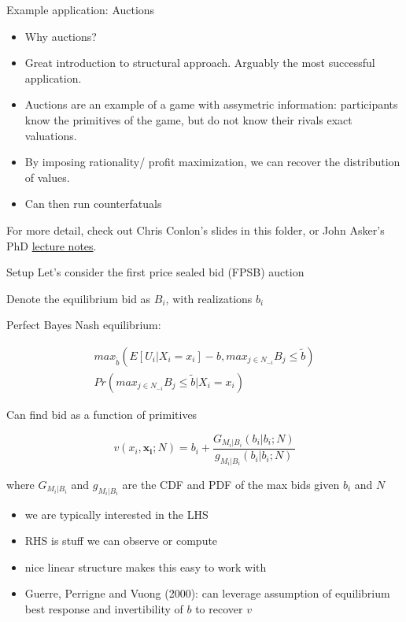 \begin{frame}{Example application: Auctions}
  \begin{itemize}
    \item Why auctions? 
    \item Great introduction to structural approach. Arguably the most successful application. 
    \item Auctions are an example of a game with assymetric information: participants know the primitives of the game, but do not know their rivals exact valuations. 
    \item By imposing rationality/ profit maximization, we can recover the distribution of values. 
    \item Can then run counterfatuals
  \end{itemize}

For more detail, check out Chris Conlon's slides in this folder, or John Asker's PhD \href{http://www.johnasker.com}{lecture notes}.

\end{frame}

\begin{frame}{Setup}
Let's consider the first price sealed bid (FPSB) auction

Denote the equilibrium bid as $B_i$, with realizations $b_i$

\vspace{10pt}

Perfect Bayes Nash equilibrium:
\vspace{-10pt}

\begin{multline*} 
  max_{\tilde b}  \left( E \left[ U_i | X_i = x_i \right] - b , max_{j \in N_{-i}} B_j \leq \tilde b \right) \\ Pr \left( max_{j \in N_{-i}} B_j \leq \tilde b | X_i = x_i \right) 
\end{multline*}
\end{frame}  

\begin{frame}{Can find bid as a function of primitives}

  $$ v(x_i,\mathbf{x_i};N) = b_i + \frac{G_{M_i | B_i} \left(b_i | b_i ; N \right)}{ g_{M_i | B_i} \left(b_i | b_i ; N \right)} $$

  where $G_{M_i | B_i}$ and $g_{M_i | B_i}$ are the CDF and PDF of the max bids given $b_i$ and $N$ 

  \begin{itemize}
    \item we are typically interested in the LHS
    \item RHS is stuff we can observe or compute
    \item nice linear structure makes this easy to work with
    \item Guerre, Perrigne and Vuong (2000): can leverage assumption of equilibrium best response and invertibility of $b$ to recover $v$
  \end{itemize}

\end{frame}  

